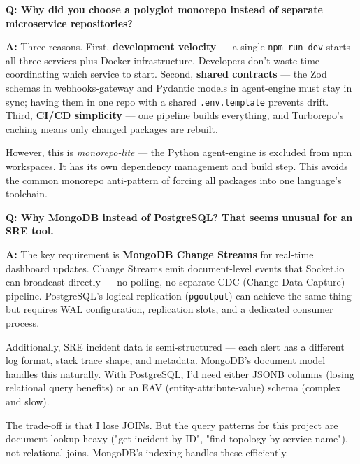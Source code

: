 \documentclass[11pt,a4paper]{article}
\begin{document}
\begin{interviewbox}
\textbf{Q: Why did you choose a polyglot monorepo instead of separate microservice repositories?}

\textbf{A:} Three reasons. First, \textbf{development velocity} — a single \texttt{npm run dev} starts all
three services plus Docker infrastructure. Developers don't waste time coordinating which
service to start. Second, \textbf{shared contracts} — the Zod schemas in webhooks-gateway
and Pydantic models in agent-engine must stay in sync; having them in one repo with a
shared \texttt{.env.template} prevents drift. Third, \textbf{CI/CD simplicity} — one
pipeline builds everything, and Turborepo's caching means only changed packages are rebuilt.

However, this is \textit{monorepo-lite} — the Python agent-engine is excluded from npm
workspaces. It has its own dependency management and build step. This avoids the common
monorepo anti-pattern of forcing all packages into one language's toolchain.
\end{interviewbox}

\begin{interviewbox}
\textbf{Q: Why MongoDB instead of PostgreSQL? That seems unusual for an SRE tool.}

\textbf{A:} The key requirement is \textbf{MongoDB Change Streams} for real-time dashboard
updates. Change Streams emit document-level events that Socket.io can broadcast directly —
no polling, no separate CDC (Change Data Capture) pipeline. PostgreSQL's logical replication
(\texttt{pgoutput}) can achieve the same thing but requires WAL configuration, replication
slots, and a dedicated consumer process.

Additionally, SRE incident data is semi-structured — each alert has a different log format,
stack trace shape, and metadata. MongoDB's document model handles this naturally. With
PostgreSQL, I'd need either JSONB columns (losing relational query benefits) or an EAV
(entity-attribute-value) schema (complex and slow).

The trade-off is that I lose JOINs. But the query patterns for this project are
document-lookup-heavy ("get incident by ID", "find topology by service name"), not
relational joins. MongoDB's indexing handles these efficiently.
\end{interviewbox}
\end{document}
